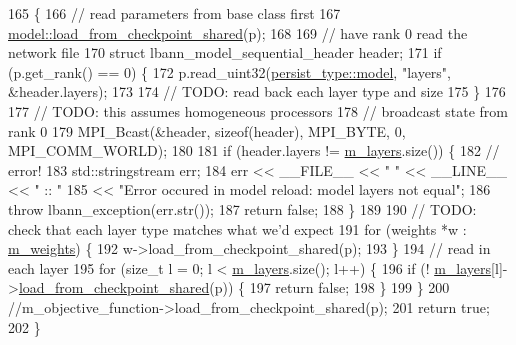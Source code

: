 \begin{DoxyCode}
165                                                              \{
166   \textcolor{comment}{// read parameters from base class first}
167   \hyperlink{classlbann_1_1model_a2e02dda11636e015ea0c892ffa541881}{model::load\_from\_checkpoint\_shared}(p);
168 
169   \textcolor{comment}{// have rank 0 read the network file}
170   \textcolor{keyword}{struct }lbann\_model\_sequential\_header header;
171   \textcolor{keywordflow}{if} (p.get\_rank() == 0) \{
172     p.read\_uint32(\hyperlink{namespacelbann_adee41f31f15f3906cbdcce4a1417eb56a20f35e630daf44dbfa4c3f68f5399d8c}{persist\_type::model}, \textcolor{stringliteral}{"layers"}, &header.layers);
173 
174     \textcolor{comment}{// TODO: read back each layer type and size}
175   \}
176 
177   \textcolor{comment}{// TODO: this assumes homogeneous processors}
178   \textcolor{comment}{// broadcast state from rank 0}
179   MPI\_Bcast(&header, \textcolor{keyword}{sizeof}(header), MPI\_BYTE, 0, MPI\_COMM\_WORLD);
180 
181   \textcolor{keywordflow}{if} (header.layers != \hyperlink{classlbann_1_1model_a0229fc226ec163d1411548446104569d}{m\_layers}.size()) \{
182     \textcolor{comment}{// error!}
183      std::stringstream err;
184      err << \_\_FILE\_\_ << \textcolor{stringliteral}{" "} << \_\_LINE\_\_ << \textcolor{stringliteral}{" :: "}
185          << \textcolor{stringliteral}{"Error occured in model reload: model layers not equal"};
186      \textcolor{keywordflow}{throw} lbann\_exception(err.str());
187      \textcolor{keywordflow}{return} \textcolor{keyword}{false};
188   \}
189 
190   \textcolor{comment}{// TODO: check that each layer type matches what we'd expect}
191   \textcolor{keywordflow}{for} (weights *w : \hyperlink{classlbann_1_1model_aaf9adefe4497d90bf5bc2567e71bfb00}{m\_weights}) \{
192     w->load\_from\_checkpoint\_shared(p);
193   \}
194   \textcolor{comment}{// read in each layer}
195   \textcolor{keywordflow}{for} (\textcolor{keywordtype}{size\_t} l = 0; l < \hyperlink{classlbann_1_1model_a0229fc226ec163d1411548446104569d}{m\_layers}.size(); l++) \{
196     \textcolor{keywordflow}{if} (! \hyperlink{classlbann_1_1model_a0229fc226ec163d1411548446104569d}{m\_layers}[l]->\hyperlink{classlbann_1_1sequential__model_aa52cca299012c67f88483206d50abb21}{load\_from\_checkpoint\_shared}(p)) \{
197       \textcolor{keywordflow}{return} \textcolor{keyword}{false};
198     \}
199   \}
200   \textcolor{comment}{//m\_objective\_function->load\_from\_checkpoint\_shared(p);}
201   \textcolor{keywordflow}{return} \textcolor{keyword}{true};
202 \}
\end{DoxyCode}
